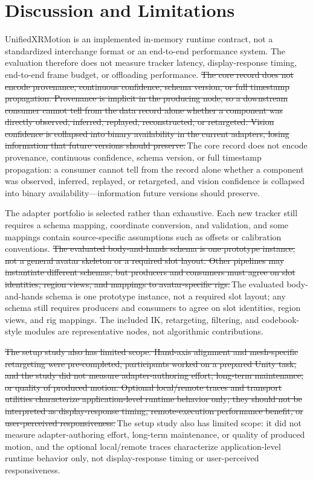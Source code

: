 \documentclass[runningheads]{llncs}
\newcommand{\radd}[1]{\textcolor{revadd}{#1}}
\newcommand{\rdel}[1]{\textcolor{revdel}{\sout{#1}}}
\newcommand{\rrep}[2]{\rdel{#1}\,\radd{#2}}
\newcommand{\radd}[1]{#1}
\newcommand{\rdel}[1]{}
\newcommand{\rrep}[2]{#2}
\begin{document}
\section{Discussion and Limitations}\label{sec:discussion-limitations}
UnifiedXRMotion is an implemented in-memory runtime contract, not a standardized interchange format or an end-to-end performance system. The evaluation therefore does not measure tracker latency, display-response timing, end-to-end frame budget, or offloading performance. \rrep{The core record does not encode provenance, continuous confidence, schema version, or full timestamp propagation. Provenance is implicit in the producing node, so a downstream consumer cannot tell from the data record alone whether a component was directly observed, inferred, replayed, reconstructed, or retargeted. Vision confidence is collapsed into binary availability in the current adapters, losing information that future versions should preserve.}{The core record does not encode provenance, continuous confidence, schema version, or full timestamp propagation: a consumer cannot tell from the record alone whether a component was observed, inferred, replayed, or retargeted, and vision confidence is collapsed into binary availability---information future versions should preserve.}

The adapter portfolio is selected rather than exhaustive. Each new tracker still requires a schema mapping, coordinate conversion, and validation, and some mappings contain source-specific assumptions such as offsets or calibration conventions. \rrep{The evaluated body-and-hands schema is one prototype instance, not a general avatar skeleton or a required slot layout. Other pipelines may instantiate different schemas, but producers and consumers must agree on slot identities, region views, and mappings to avatar-specific rigs.}{The evaluated body-and-hands schema is one prototype instance, not a required slot layout; any schema still requires producers and consumers to agree on slot identities, region views, and rig mappings.} The included IK, retargeting, filtering, and codebook-style modules are representative nodes, not algorithmic contributions.

\rrep{The setup study also has limited scope. Hand-axis alignment and mesh-specific retargeting were pre-completed, participants worked on a prepared Unity task, and the study did not measure adapter-authoring effort, long-term maintenance, or quality of produced motion. Optional local/remote traces and transport utilities characterize application-level runtime behavior only; they should not be interpreted as display-response timing, remote-execution performance benefit, or user-perceived responsiveness.}{The setup study also has limited scope: it did not measure adapter-authoring effort, long-term maintenance, or quality of produced motion, and the optional local/remote traces characterize application-level runtime behavior only, not display-response timing or user-perceived responsiveness.}
\end{document}
